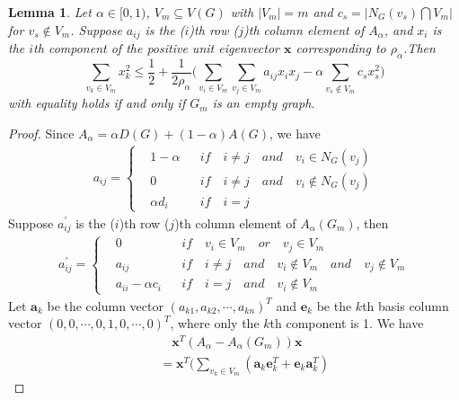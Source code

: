 \documentclass[amsthm]{elsart}
\newtheorem{lemma}{Lemma}[section]
\begin{document}
\begin{lemma} \label{lem:2.2}
Let $\alpha \in [0, 1)$, $V_m \subseteq V(G)$ with $|V_m|=m$ and $ c_s = |N_G(v_s) \bigcap V_m|$ for $v_s\notin V_m$.
Suppose $a_{ij}$ is the ($i$)th row ($j$)th column element of $A_\alpha$, and $x_i$ is the $i$th component of the positive unit eigenvector $\textbf{x}$ corresponding to $\rho_\alpha$.Then
\begin{equation} \label{equ:11}
\sum \limits_{v_k \in V_m}^{} x_k^2
\leqslant \frac{1}{2} + \frac{1}{2 \rho_\alpha} \Big( \sum \limits_{v_i \in V_m}^{} \sum \limits_{v_j \in V_m}^{} a_{ij} x_i x_j - \alpha \sum \limits_{v_s \notin V_m}^{} c_s x_s^2 \Big)
\end{equation}
with equality holds if and only if $G_m$ is an empty graph.
\end{lemma}
\begin{proof}
Since $A_\alpha = \alpha D(G) + (1 - \alpha)A(G)$, we have
\begin{eqnarray*}
 a_{ij} =
\left\{
\begin{aligned}
&1 - \alpha    && if \quad i \neq j  \quad and \quad v_i \in N_G(v_j) \\
&0    && if \quad i \neq j  \quad and \quad v_i \notin N_G(v_j) \\
&\alpha d_i    && if \quad i = j
\end{aligned}
\right.
\end{eqnarray*}
Suppose   $a_{ij}^{\prime}$ is the ($i$)th row ($j$)th column element of $A_\alpha(G_m)$, then
\begin{eqnarray*}
 a_{ij}^{\prime} =
\left\{
\begin{aligned}
&0    && if \quad v_i \in V_m \quad or \quad v_j \in V_m \\
&a_{ij}    && if \quad i \neq j  \quad and \quad v_i \notin V_m  \quad and \quad v_j \notin V_m \\
&a_{ii} - \alpha c_i    && if \quad i = j \quad and \quad v_i \notin V_m
\end{aligned}
\right.
\end{eqnarray*}
Let $\textbf{a}_k$ be the column vector $(a_{k1}, a_{k2}, \cdots , a_{kn})^T$ and $\textbf{e}_k$ be the $k$th basis column vector $(0, 0, \cdots , 0, 1, 0, \cdots , 0)^T$,
 where only the $k$th component is 1. We have
\begin{eqnarray*}
 && \quad \textbf{x}^T(A_\alpha - A_\alpha(G_m))\textbf{x}
\\ &&= \textbf{x}^T \Big(\sum \limits_{v_k \in V_m}^{} (\textbf{a}_k \textbf{e}_k^T + \textbf{e}_k \textbf{a}_k^T)

\end{eqnarray*}
\end{proof}
\end{document}
